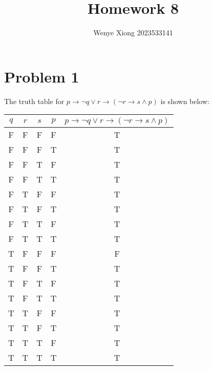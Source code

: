 \documentclass{article}
\author{Wenye Xiong 2023533141}
\title{Homework 8}
\begin{document}
\maketitle
\section{Problem 1}
The truth table for $ p \rightarrow \neg q \vee r \rightarrow (\neg r \rightarrow s \wedge p)$ is shown below:\\
\begin{table}[H]
\centering
\begin{tabular}{|c|c|c|c|c|}
\hline
$q$ & $r$ & $s$ & $p$ & $ p \rightarrow \neg q \vee r \rightarrow (\neg r \rightarrow s \wedge p)$\\
\hline
F & F & F & F & T\\
F & F & F & T & T\\
F & F & T & F & T\\
F & F & T & T & T\\
F & T & F & F & T\\
F & T & F & T & T\\
F & T & T & F & T\\
F & T & T & T & T\\
T & F & F & F & F\\
T & F & F & T & T\\
T & F & T & F & T\\
T & F & T & T & T\\
T & T & F & F & T\\
T & T & F & T & T\\
T & T & T & F & T\\
T & T & T & T & T\\
\hline
\end{tabular}
\end{table}
\end{document}
